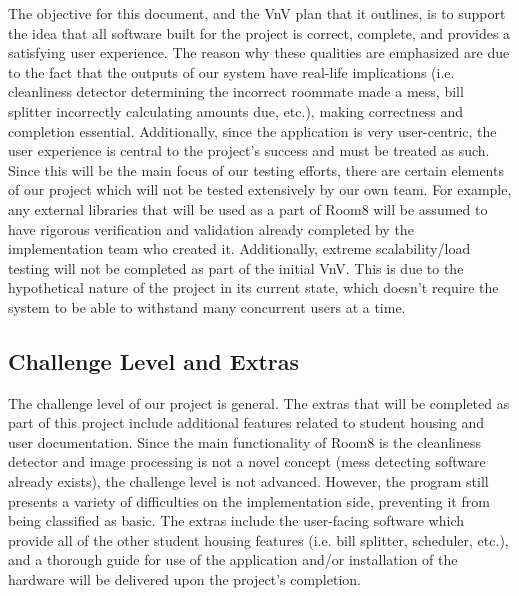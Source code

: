 \documentclass[12pt, titlepage]{article}
\begin{document}
The objective for this document, and the VnV plan that it outlines, is to support the idea that all software built for the project is correct, complete, and provides a satisfying user experience. The reason why these qualities are emphasized are due to the fact that the outputs of our system have real-life implications (i.e. cleanliness detector determining the incorrect roommate made a mess, bill splitter incorrectly calculating amounts due, etc.), making correctness and completion essential. Additionally, since the application is very user-centric, the user experience is central to the project's success and must be treated as such. Since this will be the main focus of our testing efforts, there are certain elements of our project which will not be tested extensively by our own team. For example, any external libraries that will be used as a part of Room8 will be assumed to have rigorous verification and validation already completed by the implementation team who created it. Additionally, extreme scalability/load testing will not be completed as part of the initial VnV. This is due to the hypothetical nature of the project in its current state, which doesn't require the system to be able to withstand many concurrent users at a time. 

\subsection{Challenge Level and Extras}



The challenge level of our project is general. The extras that will be completed as part of this project include additional features related to student housing and user documentation. Since the main functionality of Room8 is the cleanliness detector and  image processing is not a novel concept (mess detecting software already exists), the challenge level is not advanced. However, the program still presents a variety of difficulties on the implementation side, preventing it from being classified as basic. The extras include the user-facing software which provide all of the other student housing features (i.e. bill splitter, scheduler, etc.), and a thorough guide for use of the application and/or installation of the hardware will be delivered upon the project's completion. 
\end{document}
